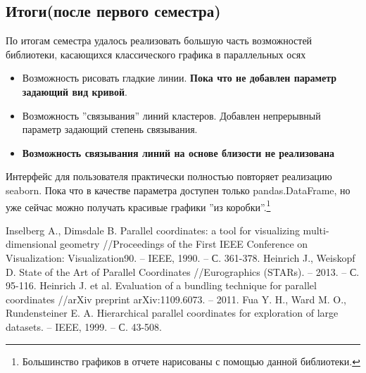 \documentclass[12pt,fleqn]{article}
\begin{document}
\subsection{Итоги(после первого семестра)}
По итогам семестра удалось реализовать большую часть возможностей библиотеки, касающихся классического
графика в параллельных осях
\begin{itemize}
    \item Возможность рисовать гладкие линии. \textbf{Пока что не добавлен параметр задающий вид кривой}.
    \item Возможность ''связывания'' линий кластеров. 
    Добавлен непрерывный параметр задающий степень связывания.
    \item \textbf{Возможность связывания линий на основе близости не реализована}
\end{itemize}

Интерфейс для пользователя практически полностью повторяет реализацию seaborn. Пока что в качестве 
параметра доступен только pandas.DataFrame, но уже сейчас можно получать красивые графики ''из коробки''.\footnote{
    Большинство графиков в отчете нарисованы с помощью данной библиотеки.}

\begin{thebibliography}{99}
     Inselberg A., Dimsdale B. Parallel coordinates: 
    a tool for visualizing multi-dimensional geometry 
    //Proceedings of the First IEEE Conference on Visualization: 
    Visualization90. – IEEE, 1990. – С. 361-378.
     Heinrich J., Weiskopf D. State of the Art of Parallel Coordinates 
    //Eurographics (STARs). – 2013. – С. 95-116.
     Heinrich J. et al. Evaluation of a bundling technique for parallel coordinates 
    //arXiv preprint arXiv:1109.6073. – 2011.
     Fua Y. H., Ward M. O., Rundensteiner E. A. Hierarchical parallel coordinates
     for exploration of large datasets. – IEEE, 1999. – С. 43-508.
\end{thebibliography}
\end{document}
